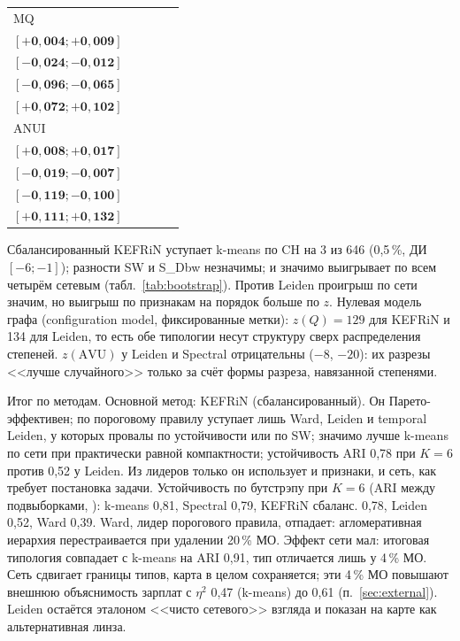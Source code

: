 \documentclass[11pt,a4paper]{article}
\begin{document}
\begin{table}[htbp]
\begin{tabular}{lcccc}
MQ & \makecell{$\mathbf{+0{,}007}$\\ $\mathbf{[+0{,}004; +0{,}009]}$} & \makecell{$\mathbf{-0{,}018}$\\ $\mathbf{[-0{,}024; -0{,}012]}$} & \makecell{$\mathbf{-0{,}081}$\\ $\mathbf{[-0{,}096; -0{,}065]}$} & \makecell{$\mathbf{+0{,}087}$\\ $\mathbf{[+0{,}072; +0{,}102]}$} \\
ANUI & \makecell{$\mathbf{+0{,}012}$\\ $\mathbf{[+0{,}008; +0{,}017]}$} & \makecell{$\mathbf{-0{,}013}$\\ $\mathbf{[-0{,}019; -0{,}007]}$} & \makecell{$\mathbf{-0{,}109}$\\ $\mathbf{[-0{,}119; -0{,}100]}$} & \makecell{$\mathbf{+0{,}122}$\\ $\mathbf{[+0{,}111; +0{,}132]}$} \\
\bottomrule
\end{tabular}
\end{table}

Сбалансированный KEFRiN уступает k-means по CH на 3 из 646 (0,5\,\%, ДИ $[-6; -1]$); разности SW и S\_Dbw незначимы; и значимо выигрывает по всем четырём сетевым (табл.~\ref{tab:bootstrap}). Против Leiden проигрыш по сети значим, но выигрыш по признакам на порядок больше по $z$. Нулевая модель графа (configuration model, фиксированные метки): $z(Q)=129$ для KEFRiN и 134 для Leiden, то есть обе типологии несут структуру сверх распределения степеней. $z(\mathrm{AVU})$ у Leiden и Spectral отрицательны ($-8$, $-20$): их разрезы <<лучше случайного>> только за счёт формы разреза, навязанной степенями.

Итог по методам. Основной метод: KEFRiN (сбалансированный). Он Парето-эффективен; по пороговому правилу уступает лишь Ward, Leiden и temporal Leiden, у которых провалы по устойчивости или по SW; значимо лучше k-means по сети при практически равной компактности; устойчивость ARI 0,78 при $K=6$ против 0,52 у Leiden. Из лидеров только он использует и признаки, и сеть, как требует постановка задачи. Устойчивость по бутстрэпу при $K=6$ (ARI между подвыборками, \cite{hennig}): k-means 0,81, Spectral 0,79, KEFRiN сбаланс. 0,78, Leiden 0,52, Ward 0,39. Ward, лидер порогового правила, отпадает: агломеративная иерархия перестраивается при удалении 20\,\% МО. Эффект сети мал: итоговая типология совпадает с k-means на ARI 0,91, тип отличается лишь у 4\,\% МО. Сеть сдвигает границы типов, карта в целом сохраняется; эти 4\,\% МО повышают внешнюю объяснимость зарплат с $\eta^2$ 0,47 (k-means) до 0,61 (п.~\ref{sec:external}). Leiden остаётся эталоном <<чисто сетевого>> взгляда и показан на карте как альтернативная линза.
\end{document}
